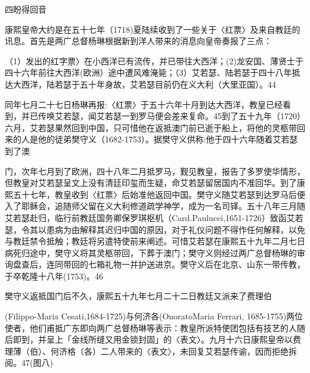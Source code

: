四盼得回音

康熙皇帝大约是在五十七年（1718)夏陆续收到了一些关于〈红票〉及来自教廷的讯息。首先是两广总督杨琳根据新到洋人带来的消息向皇帝奏报了三点：

\begin{BookQuote}
（1）发出的红字票〉在小西洋已有流传，并已带往大西洋；(2)龙安国、薄贤士于四十六年前往大西洋(欧洲）途中遭风难淹毙；（3）艾若瑟、陆若瑟于四十八年抵达大西洋，陆若瑟于五十年身故，艾若瑟目前仍在义大利（大里亚国）。44
\end{BookQuote}

同年七月二十七日杨琳再报:〈红票〉于五十六年十月到达大西洋，教皇已经看到，并已传唤艾若瑟，闻艾若瑟一到罗马便会差来复命。45到了五十九年（1720）六月，艾若瑟果然回到中国，只可惜他在返抵澳门前已逝于船上，将他的灵柩带回来的人是他的徒弟樊守义（1682-1753）。据樊守义供称:他于四十六年随着艾若瑟到了澳

\vfill
\begin{BookNotes}
\end{BookNotes}

\noindent 门，次年七月到了欧洲，四十八年二月抵罗马，觐见教皇，报告了多罗使华情形，但教皇对艾若瑟呈文上没有清廷印玺而生疑，命艾若瑟留居国内不准回华。到了康熙五十七年，教皇收到〈红票〉后始准他返回中国。樊守义随艾若瑟到达罗马后便入了耶稣会，追随师父留在义大利修道疏学神学，成为一名司铎。五十八年三月随艾若瑟赴归，临行前教廷国务卿保罗琪枢机（Card.Paulucei,1651-1726）致函艾若瑟，令其以患病为由解释其迟归中国的原因，对于礼仪问题不得作任何解释，以免与教廷禁令抵触；教廷将另遣特使前来阐述。可惜艾若瑟在康熙五十九年二月七日病死归途中，樊守义将其灵柩带回，下葬于澳门；樊守义则经过两广总督杨琳的审询盘查后，连同带回的七箱礼物一并护送进京。樊守义后在北京、山东一带传教，于卒乾隆十八年(1753)。46

\begin{BookQuote}
樊守义返抵国门后不久，康熙五十九年七月二十二日教廷又派来了费理伯
\end{BookQuote}

(Filippo-Maria Cesati,1684-1725)与何济各(OnoratoMaria Ferrari, 1685-1755)两位使者，他们甫抵广东即向两广总督杨琳等表示：教皇所派特使团包括有技艺的人随后即到，并呈上「金线所缝又用金锁封固」的〈表文〉。九月十六日康熙皇帝以费理薄（伯）、何济格（各）二人带来的〈表文〉，未回复艾若瑟传谕，因而拒绝拆阅。47(图八)

